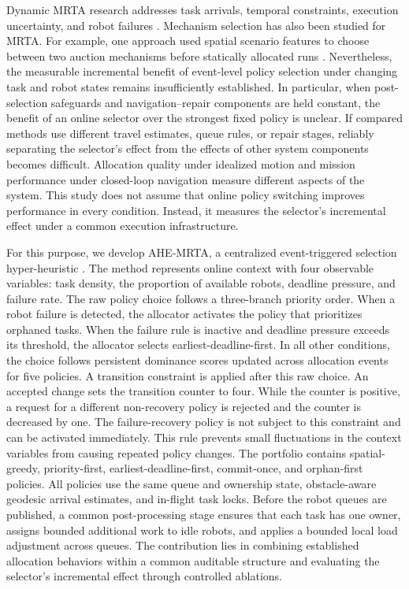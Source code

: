 \documentclass[10pt,letterpaper,onecolumn]{IEEEtran}
\begin{document}
Dynamic MRTA research addresses task arrivals, temporal constraints, execution
uncertainty, and robot failures \cite{ghassemi2022bigmrta,
choudhury2021dynamic,rostam2024selfadaptive}. Mechanism selection has also been
studied for MRTA. For example, one approach used spatial scenario features to
choose between two auction mechanisms before statically allocated runs
\cite{schneider2017mechanism}. Nevertheless, the measurable incremental benefit
of event-level policy selection under changing task and robot states remains
insufficiently established. In particular, when post-selection safeguards and
navigation--repair components are held constant, the benefit of an online
selector over the strongest fixed policy is unclear. If compared methods use
different travel estimates, queue rules, or repair stages, reliably separating
the selector's effect from the effects of other system components becomes
difficult. Allocation quality
under idealized motion and mission performance under closed-loop navigation
measure different aspects of the system. This study does not assume that online
policy switching improves performance in every condition. Instead, it measures
the selector's incremental effect under a common execution infrastructure.

For this purpose, we develop AHE-MRTA, a centralized event-triggered selection
hyper-heuristic \cite{burke2013hyper}. The method represents online context with
four observable variables: task density, the proportion of available robots,
deadline pressure, and failure rate. The raw policy choice follows a three-branch
priority order. When a robot failure is detected, the allocator activates the
policy that prioritizes orphaned tasks. When the failure rule is inactive and
deadline pressure exceeds its threshold, the allocator selects
earliest-deadline-first. In all other conditions, the choice follows persistent
dominance scores updated across allocation events for five policies. A
transition constraint is applied after this raw choice. An accepted change sets
the transition counter to four. While the counter is positive, a request for a
different non-recovery policy is rejected and the counter is decreased by one.
The failure-recovery policy is not subject to this constraint and can be
activated immediately. This rule prevents small fluctuations in the context
variables from causing repeated policy changes. The portfolio contains
spatial-greedy, priority-first, earliest-deadline-first, commit-once, and
orphan-first policies. All policies use the same queue and ownership state,
obstacle-aware geodesic arrival estimates, and in-flight task locks. Before the
robot queues are published, a common post-processing stage ensures that each
task has one owner, assigns bounded additional work to idle robots, and applies
a bounded local load adjustment across queues. The contribution lies in
combining established allocation behaviors within a common auditable structure
and evaluating the selector's incremental effect through controlled ablations.
\end{document}
